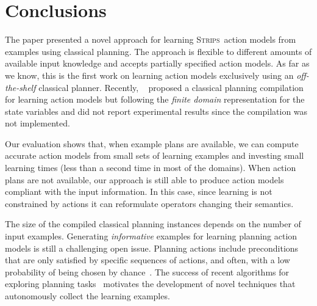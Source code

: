 \documentclass[letterpaper]{article} %
\newcommand{\strips}{\textsc{Strips}}     %
\begin{document}
\section{Conclusions}
The paper presented a novel approach for learning \strips\ action models from examples using classical planning. The approach is flexible to different amounts of available input knowledge and accepts partially specified action models. As far as we know, this is the first work on learning action models exclusively using an {\em off-the-shelf} classical planner. Recently, ~\citeauthor{stern2017efficient} proposed a classical planning compilation for learning action models but following the {\em finite domain} representation for the state variables and did not report experimental results since the compilation was not implemented.

Our evaluation shows that, when example plans are available, we can compute accurate action models from small sets of learning examples and investing small learning times (less than a second time in most of the domains). When action plans are not available, our approach is still able to produce action models compliant with the input information. In this case, since learning is not constrained by actions it can reformulate operators changing their semantics. %


The size of the compiled classical planning instances depends on the number of input examples. Generating {\em informative} examples for learning planning action models is still a challenging open issue. Planning actions include preconditions that are only satisfied by specific sequences of actions, and often, with a low probability of being chosen by chance~\cite{fern2004learning}. The success of recent algorithms for exploring planning tasks~\cite{geffner:novelty:IJCAI17} motivates the development of novel techniques that autonomously collect the learning examples.
\end{document}
